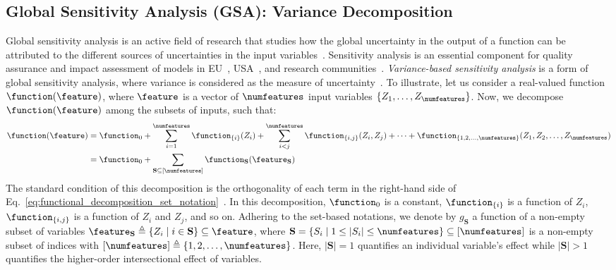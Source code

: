 \subsection{Global Sensitivity Analysis (GSA): Variance Decomposition}
Global sensitivity analysis is an active field of research that studies how the global uncertainty in the output of a function can be attributed to the different sources of uncertainties in the input variables~\citep{saltelli2008global}.
Sensitivity analysis is an essential component for quality assurance and impact assessment of models in EU~\citep{eu}, USA~\citep{usepa}, and research communities~\citep{saltelli2020five}.
\emph{Variance-based sensitivity analysis} is a form of global sensitivity analysis, where variance is considered as the measure of uncertainty~\citep{sobol1990sensitivity,sobol2001global}. To illustrate, let us consider a real-valued function $  \function(\feature) $, where $ \feature $ is a vector of $ \numfeatures $ input variables $ \{Z_1, \dots, Z_\numfeatures\} $.
Now, we decompose $ \function(\feature) $ among the subsets of inputs, such that:
\begin{align}
	\function(\feature) &= \function_0 + \sum_{i=1}^{\numfeatures} \function_{\{i\}}(Z_i) +  \sum_{i < j}^{\numfeatures} \function_{\{i,j\}}(Z_i, Z_j)  + \cdots\notag + \function_{\{1, 2, \dots, \numfeatures\}} (Z_1, Z_2, \dots, Z_{\numfeatures})\\
	&= \function_0 +  \sum_{\mathbf{S} \subseteq [\numfeatures]} \function_{\mathbf{S}}(\feature_{\mathbf{S}})\label{eq:functional_decomposition_set_notation}
\end{align}
The standard condition of this decomposition is the orthogonality of each term in the right-hand side of Eq.~\eqref{eq:functional_decomposition_set_notation}~\citep{sobol1990sensitivity}. In this decomposition, $ \function_0 $ is a constant, $ \function_{\{i\}} $ is a function of $ Z_i $, $ \function_{\{i,j\}} $ is a function of $ Z_i $ and $ Z_j $, and so on. Adhering to the set-based notations, we denote by $ g_{\mathbf{S}} $ a function of a non-empty subset of variables $ \feature_{\mathbf{S}}  \triangleq \{Z_i \mid i \in \mathbf{S}\} \subseteq \feature $, where $ \mathbf{S} = \{S_i \mid 1 \le |S_i| \le \numfeatures\} \subseteq [\numfeatures] $ is a non-empty subset of indices with $ [\numfeatures] \triangleq \{1,2,\dots, \numfeatures\}  $.  Here, $|\mathbf{S}|=1$ quantifies an individual variable's effect while $|\mathbf{S}|>1$ quantifies the higher-order intersectional effect of variables.

